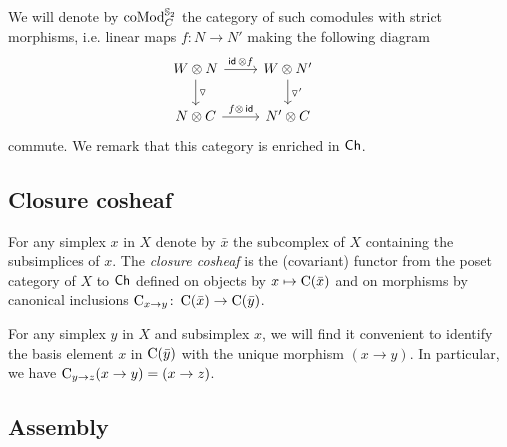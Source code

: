 We will denote by $\operatorname{coMod}_C^{\mathbb{S}_2}$ the category of such comodules with strict morphisms, i.e. linear maps $f \colon N \to N'$ making the following diagram
\[
\begin{tikzcd}
	W \ot N \arrow[d, "\triangledown"] \arrow[r, "\id\, \ot f"] &
	W \ot N' \arrow[d, "\triangledown'"] & \\
	N \ot C \arrow[r, "f \ot\, \id"] &
	N' \ot C
\end{tikzcd}
\]
commute.
We remark that this category is enriched in $\mathsf{Ch}$.


\subsection{Closure cosheaf}

For any simplex $x$ in $X$ denote by $\bar x$ the subcomplex of $X$ containing the subsimplices of $x$.
The \textit{closure cosheaf} is the (covariant) functor from the poset category of $X$ to $\mathsf{Ch}$ defined on objects by $x \mapsto \operatorname{C}(\bar x)$ and on morphisms by canonical inclusions $\operatorname{C}_{x \to y} \colon \operatorname{C}(\bar x) \to \operatorname{C}(\bar y)$.

For any simplex $y$ in $X$ and subsimplex $x$, we will find it convenient to identify the basis element $x$ in $\operatorname{C}(\bar y)$ with the unique morphism $(x \to y)$.
In particular, we have $\operatorname{C}_{y \to z} (x \to y) = (x \to z)$.

\subsection{Assembly}\label{ss:assembly}

